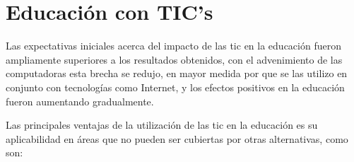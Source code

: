 \section{Educación con TIC's}
\label{sec:tics_EDUCACION_TICS}

Las expectativas iniciales acerca del impacto de las \Gls{tic} en la educación
fueron ampliamente superiores a los resultados obtenidos\cite{unesco:ict}, con
el advenimiento de las computadoras esta brecha se redujo, en mayor medida por
que se las utilizo en conjunto con tecnologías como Internet, y los efectos
positivos en la educación fueron aumentando gradualmente\cite{unesco:ict}.

Las principales ventajas de la utilización de las \Gls{tic} en la educación es
su aplicabilidad en áreas que no pueden ser cubiertas por otras alternativas,
como son:

